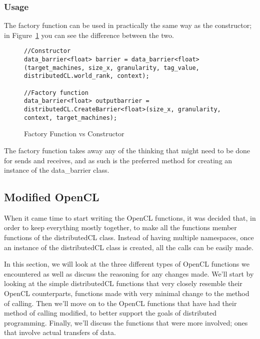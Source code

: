 \documentclass[../thesis.tex]{subfiles}
\begin{document}
    \subsubsection{Usage} %
    \label{ssub:usage}
        The factory function can be used in practically the same way as the constructor; in Figure~\ref{fig:constructor_vs_factory} you can see the difference between the two.

        \begin{figure}[htbp]
            \centering
            \lstset{language=cpp}
            \begin{lstlisting}[tabsize=2]
//Constructor
data_barrier<float> barrier = data_barrier<float>(target_machines, size_x, granularity, tag_value, distributedCL.world_rank, context);

//Factory function
data_barrier<float> outputbarrier = distributedCL.CreateBarrier<float>(size_x, granularity, context, target_machines);
            \end{lstlisting}
            \caption{Factory Function vs Constructor}
            \label{fig:constructor_vs_factory}
        \end{figure}

    The factory function takes away any of the thinking that might need to be done for sends and receives, and as such is the preferred method for creating an instance of the data\_barrier class.


\subsection{Modified OpenCL} %
\label{sub:modified_opencl}
    When it came time to start writing the OpenCL functions, it was decided that, in order to keep everything mostly together, to make all the functions member functions of the distributedCL class. Instead of having multiple namespaces, once an instance of the distributedCL class is created, all the calls can be easily made.

    In this section, we will look at the three different types of OpenCL functions we encountered as well as discuss the reasoning for any changes made. We'll start by looking at the simple distributedCL functions that very closely resemble their OpenCL counterparts, functions made with very minimal change to the method of calling. Then we'll move on to the OpenCL functions that have had their method of calling modified, to better support the goals of distributed programming. Finally, we'll discuss the functions that were more involved; ones that involve actual transfers of data.
\end{document}
